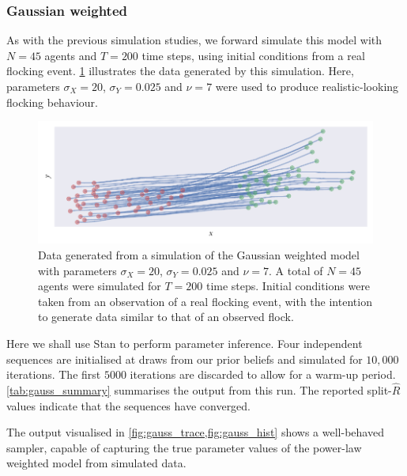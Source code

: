 \subsubsection{Gaussian weighted}

As with the previous simulation studies, we forward simulate this model with
$N=45$ agents and $T=200$ time steps, using initial conditions from a real
flocking event. \cref{fig:gauss_sim} illustrates the data generated by this
simulation. Here, parameters $\sigma_X=20$, $\sigma_Y=0.025$ and $\nu=7$ were
used to produce realistic-looking flocking behaviour.

\begin{figure}[tbp]
  \includegraphics{gauss_sim.pdf}
  \caption{Data generated from a simulation of the Gaussian weighted model with
    parameters $\sigma_X=20$, $\sigma_Y=0.025$ and $\nu=7$. A total of $N=45$
    agents were simulated for $T=200$ time steps. Initial conditions
    were taken from an observation of a real flocking event, with the intention
    to generate data similar to that of an observed flock.}
  \label{fig:gauss_sim}
\end{figure}

Here we shall use Stan to perform parameter inference. Four independent
sequences are initialised at draws from our prior beliefs and simulated for
$10,000$ iterations. The first $5000$ iterations are discarded to allow for a
warm-up period. \cref{tab:gauss_summary} summarises the output from this run.
The reported split-$\widehat{R}$ values indicate that the sequences have
converged.

The output visualised in \cref{fig:gauss_trace,fig:gauss_hist} shows a
well-behaved sampler, capable of capturing the true parameter values of the
power-law weighted model from simulated data.

